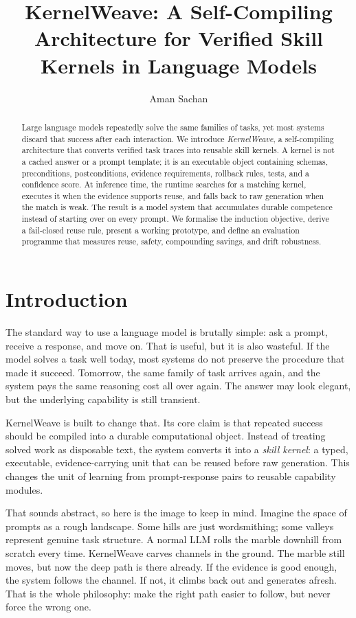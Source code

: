 \documentclass{article}
\title{KernelWeave: A Self-Compiling Architecture for Verified Skill Kernels in Language Models}
\author{Aman Sachan}
\begin{document}
\maketitle

\begin{abstract}
Large language models repeatedly solve the same families of tasks, yet most systems discard that success after each interaction. We introduce \emph{KernelWeave}, a self-compiling architecture that converts verified task traces into reusable skill kernels. A kernel is not a cached answer or a prompt template; it is an executable object containing schemas, preconditions, postconditions, evidence requirements, rollback rules, tests, and a confidence score. At inference time, the runtime searches for a matching kernel, executes it when the evidence supports reuse, and falls back to raw generation when the match is weak. The result is a model system that accumulates durable competence instead of starting over on every prompt. We formalise the induction objective, derive a fail-closed reuse rule, present a working prototype, and define an evaluation programme that measures reuse, safety, compounding savings, and drift robustness.
\end{abstract}

\section{Introduction}

The standard way to use a language model is brutally simple: ask a prompt, receive a response, and move on. That is useful, but it is also wasteful. If the model solves a task well today, most systems do not preserve the procedure that made it succeed. Tomorrow, the same family of task arrives again, and the system pays the same reasoning cost all over again. The answer may look elegant, but the underlying capability is still transient.

KernelWeave is built to change that. Its core claim is that repeated success should be compiled into a durable computational object. Instead of treating solved work as disposable text, the system converts it into a 
\emph{skill kernel}: a typed, executable, evidence-carrying unit that can be reused before raw generation. This changes the unit of learning from prompt-response pairs to reusable capability modules.

That sounds abstract, so here is the image to keep in mind. Imagine the space of prompts as a rough landscape. Some hills are just wordsmithing; some valleys represent genuine task structure. A normal LLM rolls the marble downhill from scratch every time. KernelWeave carves channels in the ground. The marble still moves, but now the deep path is there already. If the evidence is good enough, the system follows the channel. If not, it climbs back out and generates afresh. That is the whole philosophy: make the right path easier to follow, but never force the wrong one.
\end{document}
